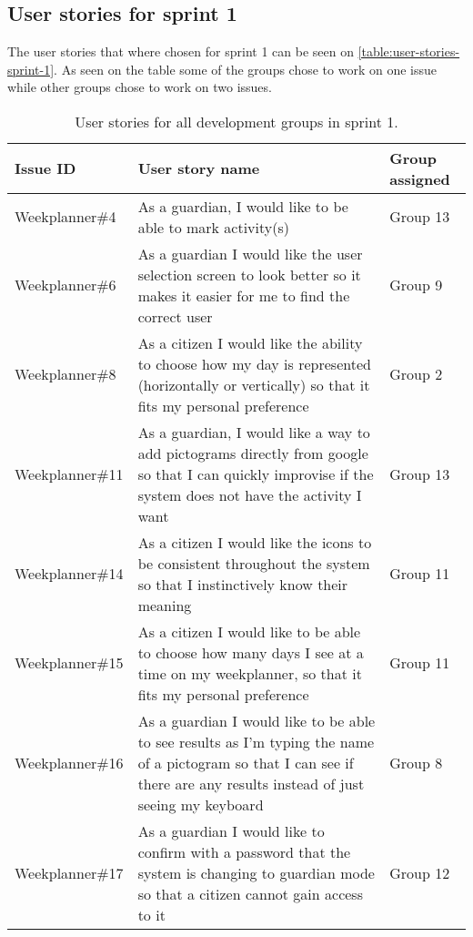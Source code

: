 \subsection{User stories for sprint 1}
The user stories that where chosen for sprint 1 can be seen on \autoref{table:user-stories-sprint-1}. As seen on the table some of the groups chose to work on one issue while other groups chose to work on two issues.

\begin{table}[H]
    \begin{tabular}{|p{2.8cm}|p{8cm}|p{2cm}|}
    \hline
    Issue ID        & User story name                                                                                                                                                          & Group assigned       \\ \hline
    Weekplanner\#4  & As a guardian, I would like to be able to mark activity(s)                                                                                                               & Group 13             \\ \hline
    Weekplanner\#6  & As a guardian I would like the user selection screen to look better so it makes it easier for me to find the correct user                                                & Group 9              \\ \hline
    Weekplanner\#8  & As a citizen I would like the ability to choose how my day is represented (horizontally or vertically) so that it fits my personal preference                            & Group 2              \\ \hline
    Weekplanner\#11 & As a guardian, I would like a way to add pictograms directly from google so that I can quickly improvise if the system does not have the activity I want                 & Group 13             \\ \hline
    Weekplanner\#14 & As a citizen I would like the icons to be consistent throughout the system so that I instinctively know their meaning                                                    & Group 11             \\ \hline
    Weekplanner\#15 & As a citizen I would like to be able to choose how many days I see at a time on my weekplanner, so that it fits my personal preference                                   & Group 11             \\ \hline
    Weekplanner\#16 & As a guardian I would like to be able to see results as I'm typing the name of a pictogram so that I can see if there are any results instead of just seeing my keyboard & Group 8              \\ \hline
    Weekplanner\#17 & As a guardian I would like to confirm with a password that the system is changing to guardian mode so that a citizen cannot gain access to it                            & Group 12             \\ \hline
    \end{tabular}
    \caption{User stories for all development groups in sprint 1.}\label{table:user-stories-sprint-1}
\end{table}


